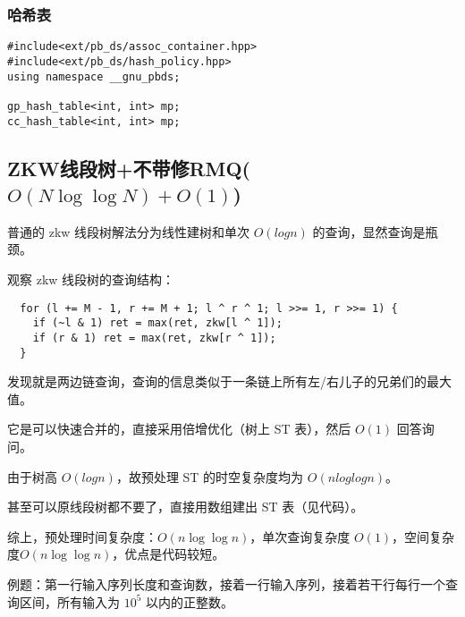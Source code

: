\documentclass[]{article}
\begin{document}
\hypertarget{ux54c8ux5e0cux8868}{%
\subsubsection{哈希表}\label{ux54c8ux5e0cux8868}}

\begin{verbatim}
#include<ext/pb_ds/assoc_container.hpp>
#include<ext/pb_ds/hash_policy.hpp>
using namespace __gnu_pbds;

gp_hash_table<int, int> mp;
cc_hash_table<int, int> mp;
\end{verbatim}

\hypertarget{zkwux7ebfux6bb5ux6811ux4e0dux5e26ux4feermqonlog-log-no1}{%
\subsection{\texorpdfstring{ZKW线段树+不带修RMQ(\(O(N\log \log N)+O(1)\))}{ZKW线段树+不带修RMQ(O(N\textbackslash log \textbackslash log N)+O(1))}}\label{zkwux7ebfux6bb5ux6811ux4e0dux5e26ux4feermqonlog-log-no1}}

普通的 zkw 线段树解法分为线性建树和单次 \(O(logn)\)
的查询，显然查询是瓶颈。

观察 zkw 线段树的查询结构：

\begin{verbatim}
  for (l += M - 1, r += M + 1; l ^ r ^ 1; l >>= 1, r >>= 1) {
    if (~l & 1) ret = max(ret, zkw[l ^ 1]);
    if (r & 1) ret = max(ret, zkw[r ^ 1]);
  }
\end{verbatim}

发现就是两边链查询，查询的信息类似于一条链上所有左/右儿子的兄弟们的最大值。

它是可以快速合并的，直接采用倍增优化（树上 ST 表），然后 \(O(1)\)
回答询问。

由于树高 \(O(logn)\)，故预处理 ST 的时空复杂度均为 \(O(nloglogn)\)。

甚至可以原线段树都不要了，直接用数组建出 ST 表（见代码）。

综上，预处理时间复杂度：\(O(n\log \log n)\)，单次查询复杂度
\(O(1)\)，空间复杂度\(O(n\log⁡ \log⁡n)\)，优点是代码较短。

例题：第一行输入序列长度和查询数，接着一行输入序列，接着若干行每行一个查询区间，所有输入为
\(10^5\) 以内的正整数。
\end{document}

